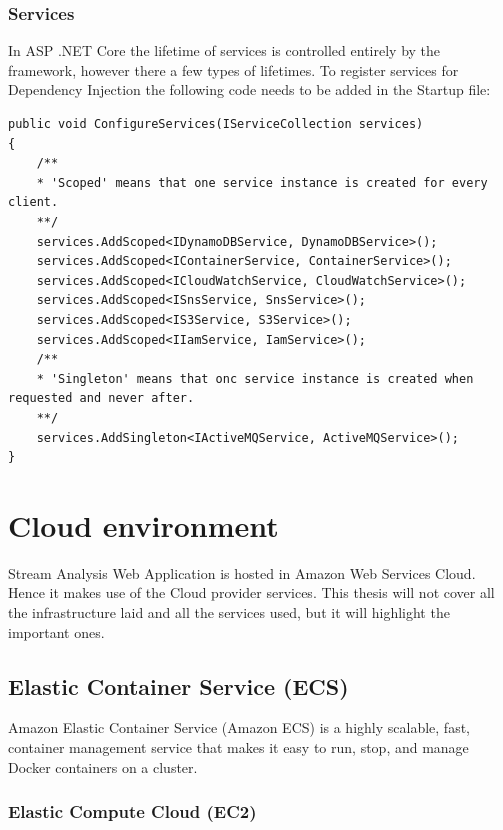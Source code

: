\subsubsection{Services}
\label{chap:04:02:03:05}

In ASP .NET Core the lifetime of services is controlled entirely by the framework, however there a few types of lifetimes. To register services for Dependency Injection the following code needs to be added in the Startup file:

\begin{lstlisting}
public void ConfigureServices(IServiceCollection services)
{
	/**
	* 'Scoped' means that one service instance is created for every client.
	**/
	services.AddScoped<IDynamoDBService, DynamoDBService>();
	services.AddScoped<IContainerService, ContainerService>();
	services.AddScoped<ICloudWatchService, CloudWatchService>();
	services.AddScoped<ISnsService, SnsService>();
	services.AddScoped<IS3Service, S3Service>();
	services.AddScoped<IIamService, IamService>();
	/**
	* 'Singleton' means that onc service instance is created when requested and never after.
	**/
	services.AddSingleton<IActiveMQService, ActiveMQService>();
}
\end{lstlisting}

\section{Cloud environment}
\label{chap:04:03}

Stream Analysis Web Application is hosted in Amazon Web Services Cloud. Hence it makes use of the Cloud provider services. This thesis will not cover all the infrastructure laid and all the services used, but it will highlight the important ones.

\subsection{Elastic Container Service (ECS)}
\label{chap:04:03:01}

Amazon Elastic Container Service (Amazon ECS) is a highly scalable, fast, container management service that makes it easy to run, stop, and manage Docker containers on a cluster.\cite{aws-ecs}

\subsubsection{Elastic Compute Cloud (EC2)}
\label{chap:04:03:01:01}

